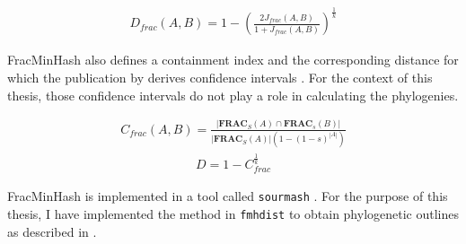 \begin{align}
  D_{frac}(A, B) = 1 - (\frac{2J_{frac}(A,B)}{1+J_{frac}(A, B)})^{\frac{1}{k}}
\end{align}

FracMinHash also defines a containment index and the corresponding distance for
which the publication by 
derives confidence intervals \cite{heraDerivingConfidenceIntervals2023}. For the
context of this thesis, those confidence intervals do not play a role in
calculating the phylogenies.

\begin{align}
  C_{frac}(A, B) = \frac{|\mathbf{FRAC}_S(A) \cap \mathbf{FRAC}_s(B)|}{|\mathbf{FRAC}_S(A)| (1-(1-s)^{|A|})}
\end{align}
\begin{align}
  D=1-C_{frac}^{\frac{1}{k}}
\end{align}


FracMinHash is implemented in a tool called \texttt{sourmash}
\cite{irberLightweightCompositionalAnalysis2022,irberDecentralizingIndicesGenomic2020}.
For the purpose of this thesis, I have implemented the method in
\texttt{fmhdist} to obtain phylogenetic outlines as described in
\cite{bagciMicrobialPhylogeneticContext2021}.
